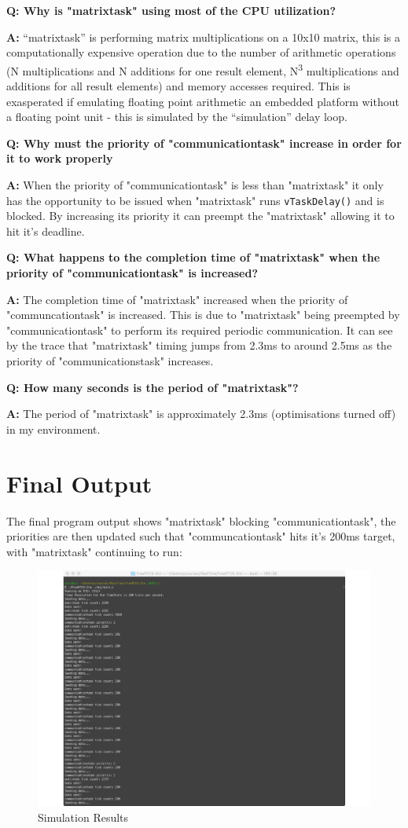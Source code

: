 \documentclass{article}
\newenvironment{qanda}{\setlength{\parindent}{0pt}}{\bigskip}
\newcommand{\Q}{\bigskip\bfseries Q: }
\newcommand{\A}{\par\textbf{A:} \normalfont}
\begin{document}
\begin{qanda}

\Q Why is "matrixtask" using most of the CPU utilization?

\A ``matrixtask'' is performing matrix multiplications on a 10x10 matrix, this is a computationally expensive operation due to the number of arithmetic operations (N multiplications and N additions for one result element, N\textsuperscript{3} multiplications and additions for all result elements) and memory accesses required.  This is exasperated if emulating floating point arithmetic an embedded platform without a floating point unit - this is simulated by the ``simulation'' delay loop. 


\Q Why must the priority of "communicationtask" increase in order for it to work properly

\A When the priority of "communicationtask" is less than "matrixtask" it only has the opportunity to be issued when "matrixtask" runs \verb|vTaskDelay()| and is blocked. By increasing its priority it can preempt the "matrixtask" allowing it to hit it's deadline.  

\Q What happens to the completion time of "matrixtask" when the priority of "communicationtask" is increased?

\A The completion time of "matrixtask" increased when the priority of "communcationtask" is increased. This is due to "matrixtask" being preempted by "communicationtask" to perform its required periodic communication. It can see by the trace that "matrixtask" timing jumps from 2.3ms to around 2.5ms as the priority of "communicationstask" increases.

\Q How many seconds is the period of "matrixtask"?

\A The period of "matrixtask" is approximately 2.3ms (optimisations turned off) in my environment.

\end{qanda}


\section{Final Output}

The final program output shows "matrixtask" blocking "communicationtask", the priorities are then updated such that "communcationtask" hits it's 200ms target, with "matrixtask" continuing to run:

\begin{figure}
    \includegraphics[width=10.0in]{week2}
    \caption{Simulation Results}
    \label{simulationfigure}
\end{figure}
\end{document}
